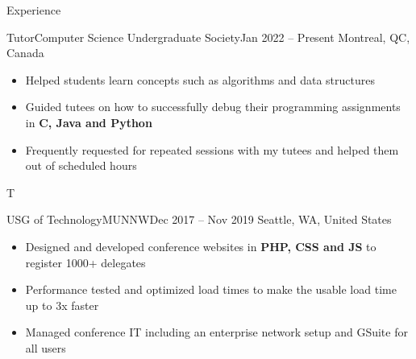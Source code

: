 \documentclass[]{mcdowellcv}
\begin{document}
\begin{cvsection}{Experience}
\begin{cvsubsection}{Tutor}{Computer Science Undergraduate Society}{Jan 2022 -- Present}
		\vspace{-2.5mm}
			Montreal, QC, Canada
			\begin{itemize}%
				\item Helped students learn concepts such as algorithms and data structures
				\item Guided tutees on how to successfully debug their programming assignments in \textbf{C, Java and Python}
				\item Frequently requested for repeated sessions with my tutees and helped them out of scheduled hours
			\end{itemize}
		\end{cvsubsection}
	\ifx\WEB T{
		\begin{cvsubsection}{USG of Technology}{MUNNW}{Dec 2017 -- Nov 2019}
			\vspace{-2.5mm}
				Seattle, WA, United States
				\begin{itemize}%
					\item Designed and developed conference websites in \textbf{PHP, CSS and JS} to register 1000+ delegates
					\item Performance tested and optimized load times to make the usable load time up to 3x faster
					\item Managed conference IT including an enterprise network setup and GSuite for all users
				\end{itemize}
			\end{cvsubsection}
	}  \fi
\end{cvsection}
\end{document}
